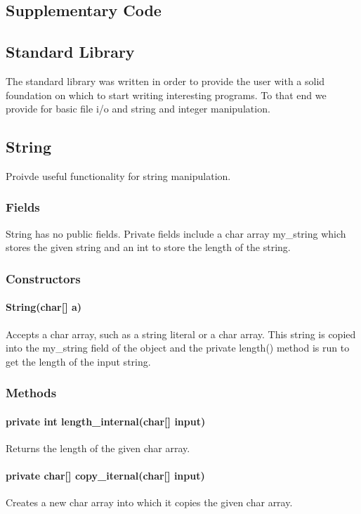 \begin{homeworkProblem}
    \chapter{Supplementary Code}
	\section{Standard Library}
    The standard library was written in order to provide the user with a solid foundation on which to start writing interesting programs. To that end we provide for basic file i/o and string and integer manipulation.
	
	\section{String}
    Proivde useful functionality for string manipulation.

	\subsection{Fields}
	String has no public fields. Private fields include a char array my\_string which stores the given string and an int to store the length of the string. 

	\subsection{Constructors}
	\subsubsection{String(char[] a)}
    Accepts a char array, such as a string literal or a char array. This string is copied into the my\_string field of the object and the private length() method is run to get the length of the input string.

	\subsection{Methods}
    \subsubsection{private int length\_internal(char[] input)}
    Returns the length of the given char array.
    \subsubsection{private char[] copy\_iternal(char[] input)}
    Creates a new char array into which it copies the given char array.

\end{homeworkProblem}
